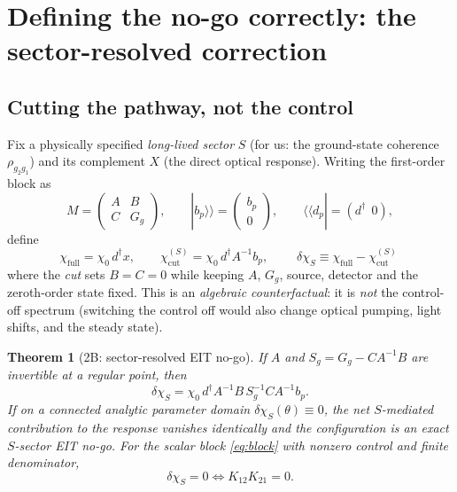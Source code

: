 \documentclass[11pt,a4paper]{article}
\newtheorem{theorem}{Theorem}[section]
\theoremstyle{remark}
\newcommand{\kett}[1]{|#1\rangle\!\rangle}
\newcommand{\braa}[1]{\langle\!\langle #1|}
\newcommand{\dchi}{\delta\chi_{S}}
\newcommand{\chifull}{\chi_{\mathrm{full}}}
\newcommand{\chicut}{\chi^{(S)}_{\mathrm{cut}}}
\begin{document}
\section{Defining the no-go correctly: the sector-resolved correction}

\subsection{Cutting the pathway, not the control}

Fix a physically specified \emph{long-lived sector} $S$ (for us: the
ground-state coherence $\rho_{g_2g_1}$) and its complement $X$ (the direct
optical response). Writing the first-order block as
\begin{equation}
M=\begin{pmatrix} A & B\\ C & G_g\end{pmatrix},
\qquad
\kett{b_p}=\begin{pmatrix}b_p\\0\end{pmatrix},
\qquad
\braa{d_p}=(d^\dagger\ \ 0),
\end{equation}
define
\begin{equation}
\chifull=\chi_0\,d^\dagger x,
\qquad
\chicut=\chi_0\,d^\dagger A^{-1}b_p,
\qquad
\boxed{\;\dchi\equiv\chifull-\chicut\;}
\end{equation}
where the \emph{cut} sets $B=C=0$ while keeping $A$, $G_g$, source, detector
and the zeroth-order state fixed. This is an \emph{algebraic counterfactual}:
it is \emph{not} the control-off spectrum (switching the control off would
also change optical pumping, light shifts, and the steady state).

\begin{theorem}[2B: sector-resolved EIT no-go]
\label{thm:2B}
If $A$ and $S_g=G_g-CA^{-1}B$ are invertible at a regular point, then
\begin{equation}
\dchi=\chi_0\,d^\dagger A^{-1} B\, S_g^{-1} C A^{-1} b_p .
\end{equation}
If on a connected analytic parameter domain $\dchi(\theta)\equiv0$, the net
$S$-mediated contribution to the response vanishes identically and the
configuration is an \emph{exact $S$-sector EIT no-go}. For the scalar block
\eqref{eq:block} with nonzero control and finite denominator,
\begin{equation}
\dchi=0\iff K_{12}K_{21}=0 .
\end{equation}
\end{theorem}
\end{document}
